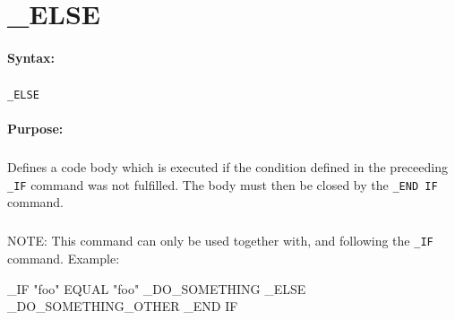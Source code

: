 
\newpage
\section{\_ELSE}
\label{cmd:_ELSE}

\paragraph{Syntax:}
\subparagraph{}
\texttt{\_ELSE}

\paragraph{Purpose:}
\subparagraph{}
Defines a code body which is executed if the 
condition defined in the preceeding \texttt{\_IF} 
command was not fulfilled. The body must then be 
closed by the \texttt{\_END IF} command.

\subparagraph{}
NOTE: This command can only be used together with, 
and following the \texttt{\_IF} command. Example:

\begin{usplisting}
    _IF "foo" EQUAL "foo"
      _DO_SOMETHING
    _ELSE
      _DO_SOMETHING_OTHER
    _END IF
\end{usplisting}
